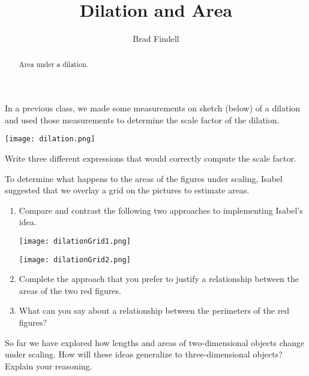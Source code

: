 \documentclass[nooutcomes]{ximera}
\title{Dilation and Area}
\author{Brad Findell}
\begin{document}
\begin{abstract}
Area under a dilation. 
\end{abstract}
\maketitle


\begin{problem}
In a previous class, we made some measurements on sketch (below) of a dilation and used those measurements to determine the scale factor of the dilation. 
\begin{image}
\texttt{[image: dilation.png]}
\end{image}
Write three different expressions that would correctly compute the scale factor.  
\vfill
\end{problem}

\newpage
\begin{problem}
To determine what happens to the areas of the figures under scaling, Isabel suggested that we overlay a grid on the pictures to estimate areas. 
\begin{enumerate} 
\item Compare and contrast the following two approaches to implementing Isabel's idea.  
\begin{image}
\texttt{[image: dilationGrid1.png]}

\texttt{[image: dilationGrid2.png]}
\end{image}
\item Complete the approach that you prefer to justify a relationship between the areas of the two red figures.  
\vfill
\item What can you say about a relationship between the perimeters of the red figures?  
\vfill
\end{enumerate}
\end{problem}

\newpage
\begin{problem}
So far we have explored how lengths and areas of two-dimensional objects change under scaling.  How will these ideas generalize to three-dimensional objects?  Explain your reasoning.  
\vfill
\end{problem}
\end{document}
